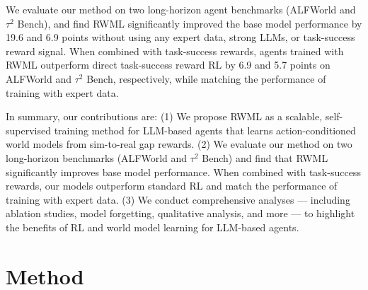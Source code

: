 \documentclass{article}
\theoremstyle{plain}
\theoremstyle{definition}
\theoremstyle{remark}
\newcommand{\method}[0]{Reinforcement World Model Learning}
\newcommand{\shortmethod}[0]{RWML}
\newcommand{\wmrlshort}[0]{\shortmethod}
\begin{document}
We evaluate our method on two long-horizon agent benchmarks (ALFWorld and $\tau^2$ Bench), and find \wmrlshort{} significantly improved the base model performance by 19.6 and 6.9 points without using any expert data, strong LLMs, or task-success reward signal.
When combined with task-success rewards, agents trained with \shortmethod{} outperform direct task-success reward RL by 6.9 and 5.7 points on ALFWorld and $\tau^2$ Bench, respectively, while matching the performance of training with expert data.

In summary, our contributions are: (1) We propose \shortmethod{} as a scalable, self-supervised training method for LLM-based agents that learns action-conditioned world models from sim-to-real gap rewards.
(2) We evaluate our method on two long-horizon benchmarks (ALFWorld and $\tau^2$ Bench) and find that \wmrlshort{} significantly improves base model performance. When combined with task-success rewards, our models outperform standard RL and match the performance of training with expert data.
(3) We conduct comprehensive analyses --- including ablation studies, model forgetting, qualitative analysis, and more --- to highlight the benefits of RL and world model learning for LLM-based agents.



\section{Method}
\label{sec:method}
\end{document}
